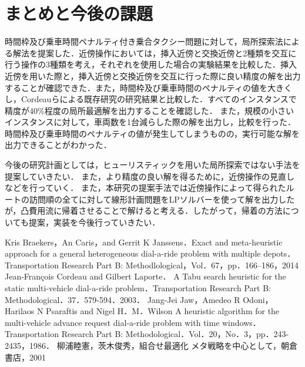 \documentclass[a4j,11pt,twocolumn]{jsarticle}
\begin{document}
\section{まとめと今後の課題}
時間枠及び乗車時間ペナルティ付き乗合タクシー問題に対して，局所探索法による解法を提案した．近傍操作においては，挿入近傍と交換近傍と2種類を交互に行う操作の3種類を考え，それぞれを使用した場合の実験結果を比較した．挿入近傍を用いた際と，挿入近傍と交換近傍を交互に行った際に良い精度の解を出力することが確認できた．また，時間枠及び乗車時間のペナルティの値を大きくし，Cordeauらによる既存研究の研究結果と比較した．すべてのインスタンスで精度が40\%程度の局所最適解を出力することを確認した．
また，規模の小さいインスタンスに対して，車両数を1台減らした際の解を出力し，比較を行った．時間枠及び乗車時間のペナルティの値が発生してしまうものの，実行可能な解を出力できることがわかった．

今後の研究計画としては，ヒューリスティックを用いた局所探索ではない手法を提案していきたい．
また，より精度の良い解を得るために，近傍操作の見直しなどを行っていく．
また，本研究の提案手法では近傍操作によって得られたルートの訪問順の全てに対して線形計画問題をLPソルバーを使って解を出力したが，凸費用流に帰着させることで解けると考える．したがって，帰着の方法についても提案，実装を今後行っていきたい．


\begin{thebibliography}{99}
   Kris Braekers，An Caris，and Gerrit K Janssens．Exact and meta-heuristic approach for a general heterogeneous dial-a-ride problem with multiple depots．Transportation Research Part B: Methodlological，Vol．67，pp．166--186，2014
   Jean-François Cordeau and Gilbert Laporte． \，A Tabu search heuristic for the static multi-vehicle dial-a-ride problem．Transportation Research Part B: Methodological．37．579-594．2003．
   Jang-Jei Jaw，Amedeo R Odoni，Harilaos N Psaraftis and Nigel H．M．Wilson \，A heuristic algorithm for the multi-vehicle advance request dial-a-ride problem with time windows．Transportation Research Part B: Methodological．Vol．20，No．3，pp．243-2435，1986．
   柳浦睦憲，茨木俊秀，組合せ最適化 メタ戦略を中心として，朝倉書店，2001
\end{thebibliography}
\end{document}

